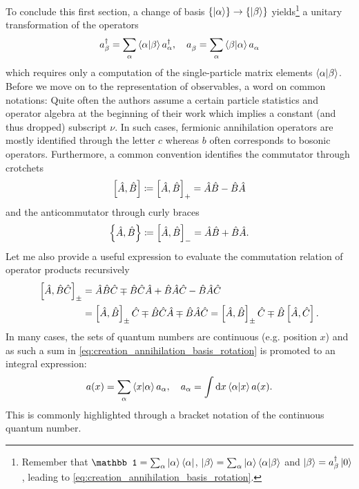 To conclude this first section, a change of basis $\{\ket\alpha\}\rightarrow\{\ket\beta\}$ yields\footnote{Remember that $\mathbb1 = \sum_\alpha\ket{\alpha}\bra{\alpha}$, $\ket{\beta} = \sum_\alpha\ket{\alpha}\braket{\alpha|\beta}$ and $\ket{\beta}=a^\dag_\beta\ket{0}$, leading to \cref{eq:creation_annihilation_basis_rotation}.} a unitary transformation of the operators
\begin{align}
    a^\dag_\beta = \sum_\alpha \braket{\alpha|\beta}a^\dag_\alpha,
    \quad
    a^\pdag_\beta = \sum_\alpha \braket{\beta|\alpha}a^\pdag_\alpha
    \label{eq:creation_annihilation_basis_rotation}
\end{align}
which requires only a computation of the single-particle matrix elements $\braket{\alpha|\beta}$.
Before we move on to the representation of observables, a word on common notations: Quite often the authors assume a certain particle statistics and operator algebra at the beginning of their work which implies a constant (and thus dropped) subscript $\nu$.
In such cases, fermionic annihilation operators are mostly identified through the letter $c$ whereas $b$ often corresponds to bosonic operators.
Furthermore, a common convention identifies the commutator through crotchets
\begin{align}
    \left[\hat A,\hat B\right]\coloneqq\left[ \hat A,\hat B \right]_+ = \hat A\hat B - \hat B\hat A
\end{align}
and the anticommutator through curly braces
\begin{align}
    \left\{ \hat A,\hat B \right\}\coloneqq\left[ \hat A,\hat B \right]_- = \hat A\hat B + \hat B\hat A.
\end{align}
Let me also provide a useful expression to evaluate the commutation relation of operator products recursively
\begin{align}
    \left[ \hat A, \hat B \hat C \right]_\pm
    &= \hat A\hat B\hat C \mp \hat B\hat C\hat A + \hat B\hat A\hat C - \hat B\hat A\hat C
    \\
    &= \left[ \hat A, \hat B \right]_\pm\hat C \mp \hat B\hat C\hat A \mp \hat B\hat A\hat C
    = \left[ \hat A, \hat B \right]_\pm\hat C \mp \hat B\left[ \hat A,\hat C \right].
    \label{eq:recursive_commutation}
\end{align}
In many cases, the sets of quantum numbers are continuous (e.g. position $x$) and as such a sum in \cref{eq:creation_annihilation_basis_rotation} is promoted to an integral expression:
\begin{align}
    a(x) = \sum_\alpha \braket{x | \alpha} a_\alpha,
    \quad
    a_\alpha = \int{\mathrm dx} \braket{\alpha | x} a(x).
\end{align}
This is commonly highlighted through a bracket notation of the continuous quantum number.
%
%
